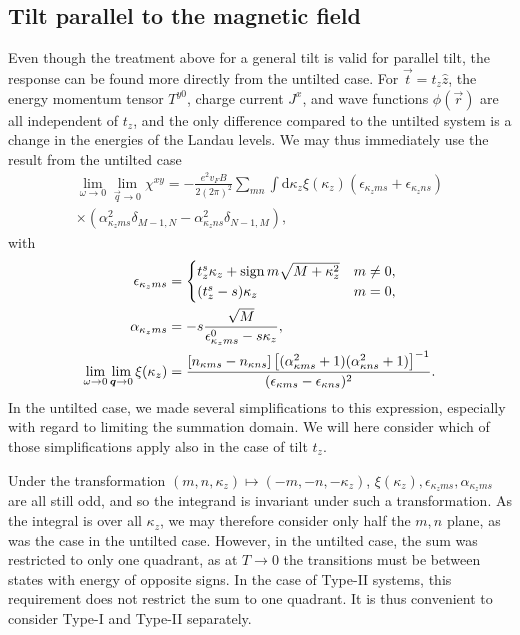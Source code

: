 \subsection{Tilt parallel to the magnetic field}
Even though the treatment above for a general tilt is valid for parallel tilt, the response can be found more directly from the untilted case.
For \( \vec{t} = t_z \hat{z} \), the energy momentum tensor \( T^{y 0} \), charge current \( J^x \), and wave functions \( \phi(\vec{r}) \) are all independent of \( t_z \), and the only difference compared to the untilted system is a change in the energies of the Landau levels.
We may thus immediately use the result from the untilted case
\begin{multline}
  \label{eq:120}
  \lim_{\omega \to 0} \lim_{\vec{q} \to 0} \chi^{xy} =
  - \frac{e^2 v_F B}{2 (2\pi)^2}
  \sum\limits_{mn} \int \mathrm{d} \kappa_z
  \xi(\kappa_z)
  (\epsilon_{\kappa_z m s} + \epsilon_{\kappa_z n s})\\
  \times (\alpha_{\kappa_z m s}^2 \delta_{M-1, N} - \alpha_{\kappa_z n s}^2 \delta_{N-1, M}),
\end{multline}
with
\begin{align}
  \label{eq:121}
  \epsilon_{\kappa_z m s} &=
                          \begin{cases}
                            t_z^s \kappa_z + \operatorname{sign}{m} \sqrt{M + \kappa_z^2} & m \neq 0,\\
                            (t_z^s - s) \kappa_z & m = 0,
                          \end{cases}\\
  \alpha_{\kappa_z m s} &=
                          -s \frac{\sqrt{M}}{\epsilon_{\kappa_z  m s}^0 - s \kappa_z },\\
  \lim_{\omega \to 0} \lim_{\bm{q} \to 0}\xi(\kappa_z) &= \frac{[n_{\kappa ms} - n_{\kappa ns}]
  \left[ (\alpha_{\kappa ms}^2 + 1) (\alpha_{\kappa ns}^2 + 1) \right]^{-1}
  }{
    (\epsilon _{\kappa m s} - \epsilon _{\kappa n s})^2
  }.
\end{align}
In the untilted case, we made several simplifications to this expression, especially with regard to limiting the summation domain.
We will here consider which of those simplifications apply also in the case of tilt \( t_z \).

Under the transformation \( (m,n,\kappa_z) \mapsto (-m, -n , -\kappa_z) \), \( \xi(\kappa_z), \epsilon_{\kappa_z m s}, \alpha_{\kappa_z m s} \) are all still odd, and so the integrand is invariant under such a transformation.
As the integral is over all \( \kappa_z \), we may therefore consider only half the \( m,n \) plane, as was the case in the untilted case.
However, in the untilted case, the sum was restricted to only one quadrant, as at \( T\to 0 \) the transitions must be between states with energy of opposite signs.
In the case of Type-II systems, this requirement does not restrict the sum to one quadrant.
It is thus convenient to consider Type-I and Type-II separately.

